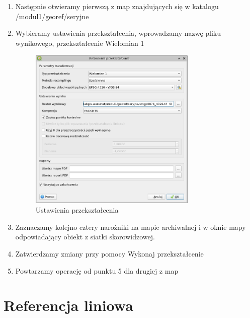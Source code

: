 \documentclass[a4paper,11pt, onecolumn, openany]{memoir}
\begin{document}
\begin{enumerate}
		\item Następnie otwieramy pierwszą z map znajdujących się w katalogu /modul1/georef/seryjne
		\item Wybieramy ustawienia przekształcenia, wprowadzamy nazwę pliku wynikowego, przekształcenie Wielomian 1
		\begin{figure}[!ht]
			\centering
			\includegraphics[width=8cm]{georef-ustawienia-skorowidz}
			\caption{Ustawienia przekształcenia}
		\end{figure}		
		\item Zaznaczamy kolejno cztery narożniki na mapie archiwalnej i w oknie mapy odpowiadający obiekt z siatki skorowidzowej.
		\item Zatwierdzamy zmiany przy pomocy Wykonaj przekształcenie
		\item Powtarzamy operację od punktu 5 dla drugiej z map
		\end{enumerate}

	\chapter{Referencja liniowa}
\end{document}
